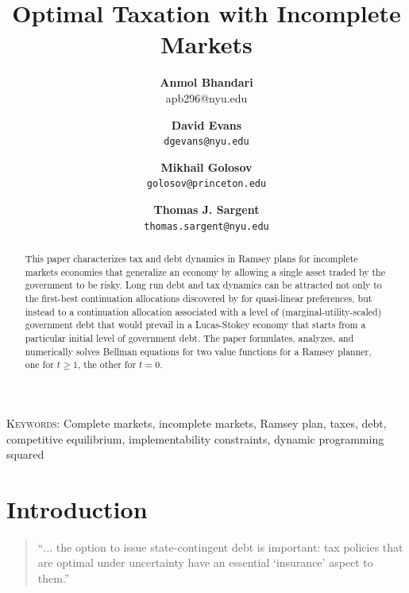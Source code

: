 \documentclass[12pt]{article}
\title {Optimal Taxation with Incomplete Markets}
\author{\textbf{Anmol Bhandari}\\apb296@nyu.edu \and \textbf{David Evans} \\ \texttt{dgevans@nyu.edu} \and \textbf{Mikhail Golosov}\\\texttt{golosov@princeton.edu} \and \textbf{Thomas J. Sargent} \\ \texttt{thomas.sargent@nyu.edu}
}
\begin{document}
\maketitle



\begin{abstract}  This paper characterizes tax and debt dynamics in Ramsey plans for incomplete markets economies that generalize
an \citet{Aiyagari2002} economy by allowing a single asset traded by the government  to be risky.
Long run debt and tax dynamics can be attracted  not only to the first-best continuation allocations discovered by \citeauthor{Aiyagari2002} for quasi-linear preferences, but instead
 to a continuation allocation  associated with a level of (marginal-utility-scaled) government debt that would prevail in a Lucas-Stokey
economy that starts from a particular initial level of government debt.  The paper formulates, analyzes, and numerically solves  Bellman equations
for two value functions for a Ramsey planner, one for $t \geq 1$, the other for $t=0$.



\end{abstract}


\noindent\textsc{Keywords:} Complete markets, incomplete markets, Ramsey plan, taxes, debt, competitive equilibrium, implementability constraints,
dynamic programming squared

\newpage

\section{Introduction}


\begin{quote}
``$\ldots$ the option to issue state-contingent debt is important: tax policies that
are optimal under uncertainty have an essential `insurance' aspect to them.'' \quad \citet[p.~88]{LucasJr.1983}
\end{quote}
\end{document}
